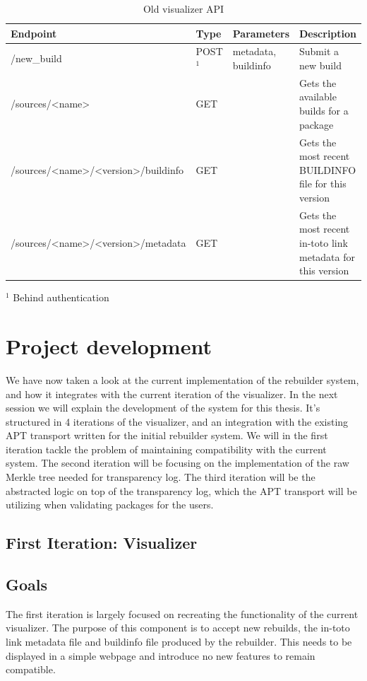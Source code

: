 \documentclass[../Main/thesis.tex]{subfiles}
\begin{document}
\begin{table}[H]
\footnotesize
\centering
\settowidth{}
\setlength\extrarowheight{2pt}
\begin{tabulary}{\textwidth}{|l|L|l|L|}
\hline
    \textbf{Endpoint} & 
    \textbf{Type} & 
    \textbf{Parameters} & 
    \textbf{Description} \\
\hline
    /new\_build & POST$^1$ & metadata, buildinfo & Submit a new build \\  \hline
    /sources/<name> & GET & & Gets the available builds for a package \\  \hline
    /sources/<name>/<version>/buildinfo& GET & & Gets the most recent BUILDINFO file for this version\\  \hline
    /sources/<name>/<version>/metadata & GET & & Gets the most recent in-toto link metadata for this version \\  \hline
\end{tabulary}
\footnotesize{$^1$ Behind authentication}\\
\caption{Old visualizer API}
\label{api:old_visualizer}
\end{table}


\section{Project development}%
\label{sec:project_development}
We have now taken a look at the current implementation of the rebuilder system,
and how it integrates with the current iteration of the visualizer. In the next
session we will explain the development of the system for this thesis. It's
structured in 4 iterations of the visualizer, and an integration with the
existing APT transport written for the initial rebuilder system. We will in the
first iteration tackle the problem of maintaining compatibility with the current
system. The second iteration will be focusing on the implementation of the raw
Merkle tree needed for transparency log. The third iteration will be the
abstracted logic on top of the transparency log, which the APT transport will be
utilizing when validating packages for the users.

\subsection{First Iteration: Visualizer}%
\label{sec:visualizer}

\subsection*{Goals}%
\label{sub:first_iteration_goals}
The first iteration is largely focused on recreating the functionality of the
current visualizer. The purpose of this component is to accept new rebuilds, the
in-toto link metadata file and buildinfo file produced by the rebuilder. This
needs to be displayed in a simple webpage and introduce no new features to
remain compatible.
\end{document}
